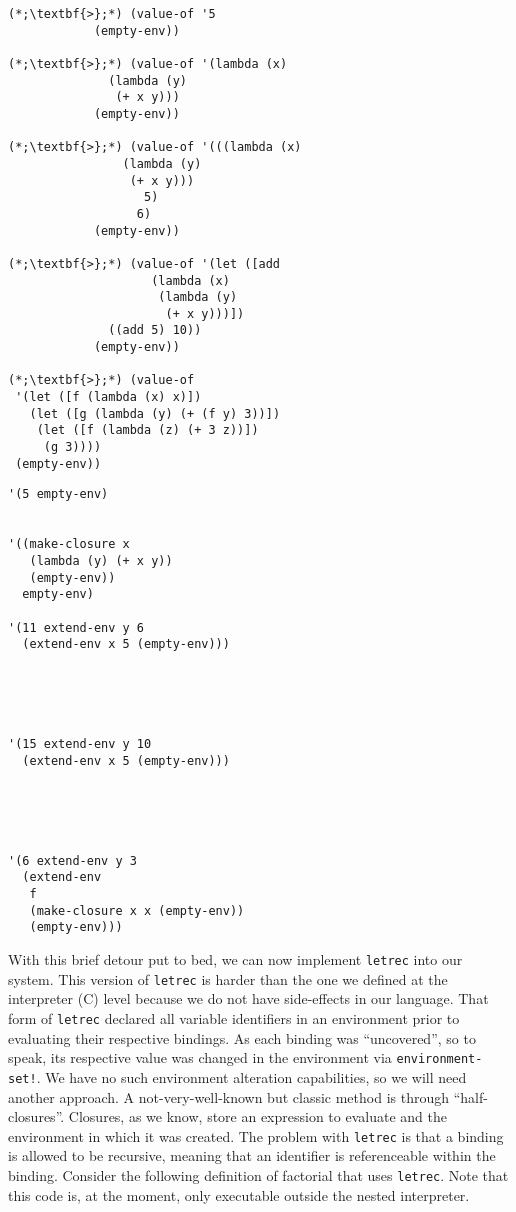 \begin{cloast}[]{}
\begin{lstlisting}[language=MyNLNSOutput]
(*;\textbf{>};*) (value-of '5 
            (empty-env))
            
(*;\textbf{>};*) (value-of '(lambda (x) 
              (lambda (y) 
               (+ x y))) 
            (empty-env))
            
(*;\textbf{>};*) (value-of '(((lambda (x) 
                (lambda (y) 
                 (+ x y))) 
                   5) 
                  6)              
            (empty-env))
            
(*;\textbf{>};*) (value-of '(let ([add 
                    (lambda (x) 
                     (lambda (y) 
                      (+ x y)))]) 
              ((add 5) 10)) 
            (empty-env))
            
(*;\textbf{>};*) (value-of 
 '(let ([f (lambda (x) x)])
   (let ([g (lambda (y) (+ (f y) 3))])
    (let ([f (lambda (z) (+ 3 z))])
     (g 3))))
 (empty-env))
\end{lstlisting}
\tcblower
\begin{lstlisting}[language=MyOutput]
'(5 empty-env)


'((make-closure x 
   (lambda (y) (+ x y)) 
   (empty-env)) 
  empty-env)
  
'(11 extend-env y 6 
  (extend-env x 5 (empty-env)))




  
'(15 extend-env y 10 
  (extend-env x 5 (empty-env)))




  
'(6 extend-env y 3 
  (extend-env 
   f 
   (make-closure x x (empty-env)) 
   (empty-env)))
\end{lstlisting}
\end{cloast}

With this brief detour put to bed, we can now implement \texttt{letrec} into our system. This version of \texttt{letrec} is harder than the one we defined at the interpreter (C) level because we do not have side-effects in our language. That form of \texttt{letrec} declared all variable identifiers in an environment prior to evaluating their respective bindings. As each binding was ``uncovered'', so to speak, its respective value was changed in the environment via \texttt{environment-set!}. We have no such environment alteration capabilities, so we will need another approach. A not-very-well-known but classic method is through ``half-closures''. Closures, as we know, store an expression to evaluate and the environment in which it was created. The problem with \texttt{letrec} is that a binding is allowed to be recursive, meaning that an identifier is referenceable within the binding. Consider the following definition of factorial that uses \texttt{letrec}. Note that this code is, at the moment, only executable outside the nested interpreter.

